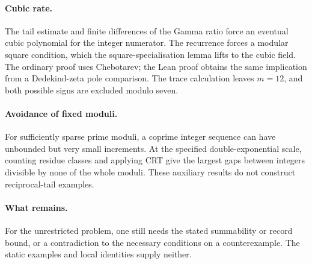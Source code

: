 \documentclass[11pt]{article}
\begin{document}
\paragraph{Cubic rate.}
The tail estimate and finite differences of the Gamma ratio force an
eventual cubic polynomial for the integer numerator. The recurrence forces a modular square condition, which the square-specialisation
lemma lifts to the cubic field. The ordinary proof uses Chebotarev; the Lean
proof obtains the same implication from a Dedekind-zeta pole comparison.
The trace calculation leaves $m=12$, and both possible signs are excluded
modulo seven.

\paragraph{Avoidance of fixed moduli.}
For sufficiently sparse prime moduli, a coprime integer sequence can
have unbounded but very small increments. At the specified
double-exponential scale, counting residue classes and applying CRT give
the largest gaps between integers divisible by none of the whole moduli.
These auxiliary results do not construct reciprocal-tail examples.

\paragraph{What remains.}
For the unrestricted problem, one still needs the stated summability or
record bound, or a contradiction to the necessary conditions on a
counterexample. The static examples and local identities supply neither.
\end{document}
